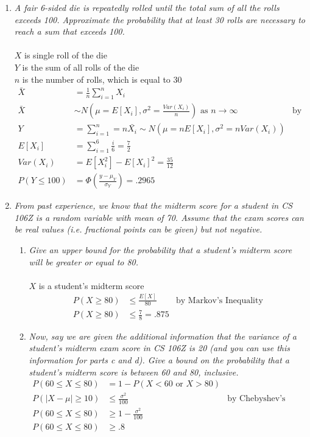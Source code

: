 \documentclass{article} %
\begin{document}
\begin{enumerate}
\begin{enumerate}
	\end{enumerate}
	
	\item \textit{A fair 6-sided die is repeatedly rolled until the total sum of all the rolls exceeds 100. Approximate the probability that at least 30 rolls are necessary to reach a sum that exceeds 100.}\\
	\\
	$X$ is single roll of the die\\
	$Y$ is the sum of all rolls of the die\\
	$n$ is the number of rolls, which is equal to 30
	\begin{align*}
	\bar{X} &= \frac{1}{n} \sum_{i = 1}^{n} X_i\\
	\bar{X} &\sim N(\mu = E[X_i], \sigma^2 = \frac{Var(X_i)}{n}) \text{ as } n \rightarrow \infty &\text{by Central Limit Theorem}\\
	Y &= \sum_{i = 1}^{n} = n \bar{X_i} \sim N(\mu = nE[X_i], \sigma^2 = nVar(X_i))\\
	E[X_i] &= \sum_{i = 1}^{6} \frac{i}{6} = \frac{7}{2}\\
	Var(X_i) &= E[X_i^2] - E[X_i]^2 = \frac{35}{12}\\
	P(Y \leq 100) &= \Phi(\frac{y - \mu_Y}{\sigma_Y}) = .2965
	\end{align*}
	
	\item \textit{From past experience, we know that the midterm score for a student in CS 106Z is a random variable with mean of 70. Assume that the exam scores can be real values (i.e. fractional points can be given) but not negative.}
	\begin{enumerate}
	\item \textit{Give an upper bound for the probability that a student's midterm score will be greater or equal to 80.}\\
	\\
	$X$ is a student's midterm score
	\begin{align*}
	P(X \geq 80) &\leq \frac{E[X]}{80} &\text{by Markov's Inequality}\\
	P(X \geq 80) &\leq \frac{7}{8} = .875
	\end{align*}
	
	\item \textit{Now, say we are given the additional information that the variance of a student's midterm exam score in CS 106Z is 20 (and you can use this information for parts c and d). Give a bound on the probability that a student's midterm score is between 60 and 80, inclusive.}
	\begin{align*}
	P(60 \leq X \leq 80) &= 1 - P(X < 60 \text{ or } X > 80)\\
	P(|X - \mu| \geq 10) &\leq \frac{\sigma^2}{100} &\text{by Chebyshev's Inequality}\\
	P(60 \leq X \leq 80) &\geq 1 - \frac{\sigma^2}{100}\\
	P(60 \leq X \leq 80) &\geq .8
	\end{align*}
	

\end{enumerate}
\end{enumerate}
\end{document}
